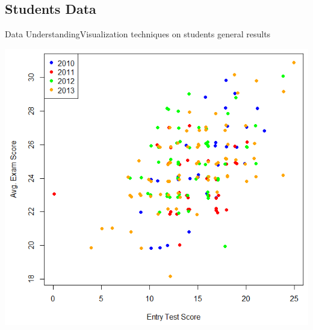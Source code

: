 \subsection{Students Data}
\begin{frame}{Data Understanding}{Visualization techniques on students general results}

    \begin{centering}
        \includegraphics[scale=0.46]{../thesis/img/scatter_plot_2.png}
    \end{centering}

\end{frame}

